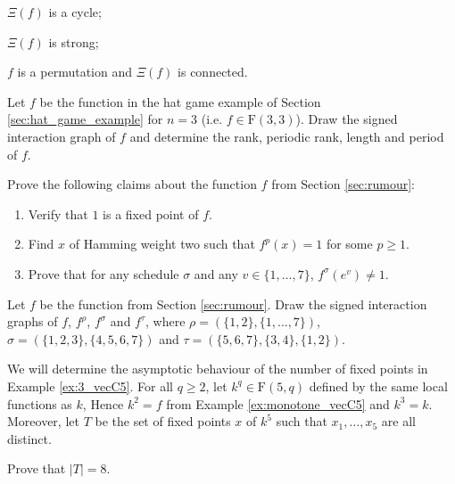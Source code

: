\documentclass[a4paper, 11pt]{book}
\numberwithin{equation}{section}
\theoremstyle{plain}
\newcommand{\graph}{\Xi}
\newcommand{\functions}{\mathrm{F}}
\renewcommand{\(}{\ldbrack}
\renewcommand{\)}{\rdbrack}
\begin{document}
\begin{exercises}
\begin{exercises}
	\item $\graph(f)$ is a cycle;
	
	\item $\graph(f)$ is strong;
	
	\item $f$ is a permutation and $\graph(f)$ is connected.
\end{exercises}




\item Let $f$ be the function in the hat game example of Section \ref{sec:hat_game_example} for $n=3$ (i.e. $f \in \functions(3,3)$). Draw the signed interaction graph of $f$ and determine the rank, periodic rank, length and period of $f$.





\item \label{exerc:rumour} Prove the following claims about the function $f$ from Section \ref{sec:rumour}:
\begin{enumerate}
	\item Verify that $1$ is a fixed point of $f$.

	\item Find $x$ of Hamming weight two such that $f^p(x) = 1$ for some $p \ge 1$.
	
	\item Prove that for any schedule $\sigma$ and any $v \in \{1, \dots, 7\}$, $f^\sigma(e^v) \ne 1$.
\end{enumerate}

\item Let $f$ be the function from Section \ref{sec:rumour}. Draw the signed interaction graphs of $f$, $f^\rho$, $f^\sigma$ and $f^\tau$, where $\rho = (\{1,2\}, \{1, \dots, 7\})$, $\sigma = (\{1,2,3\}, \{4, 5, 6, 7\})$ and $\tau = (\{5,6,7\}, \{3,4\}, \{1,2\})$.



\item \label{exerc:number_fixed_points_example} We will determine the asymptotic behaviour of the number of fixed points in Example \ref{ex:3_vecC5}. For all $q \ge 2$, let $k^q \in \functions(5, q)$ defined by the same local functions as $k$, Hence $k^2 = f$ from Example \ref{ex:monotone_vecC5} and $k^3 = k$. Moreover, let $T$ be the set of fixed points $x$ of $k^5$ such that $x_1, \dots, x_5$ are all distinct.
\begin{exercises}
	\item Prove that $|T| = 8$.
	

\end{exercises}
\end{exercises}
\end{document}
